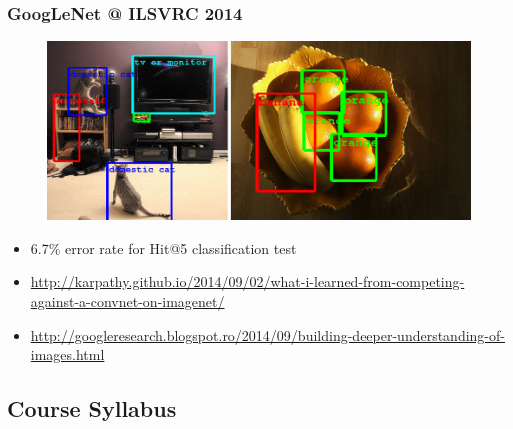 \begin{frame}
  \frametitle{GoogLeNet @ ILSVRC 2014}
  \begin{figure}[h!]
    \centering
    \includegraphics[height=.45\textheight]{graphics/googlenet.png}
    \label{fig:googlenet}
  \end{figure}

  \begin{itemize}
  \item 6.7\% error rate for Hit@5 classification test
  \item {\tiny
      \url{http://karpathy.github.io/2014/09/02/what-i-learned-from-competing-against-a-convnet-on-imagenet/}}
  \item {\tiny
      \url{http://googleresearch.blogspot.ro/2014/09/building-deeper-understanding-of-images.html}}
  \end{itemize}
\end{frame}

\subsection{Course Syllabus}
\label{sec:syllabus}

